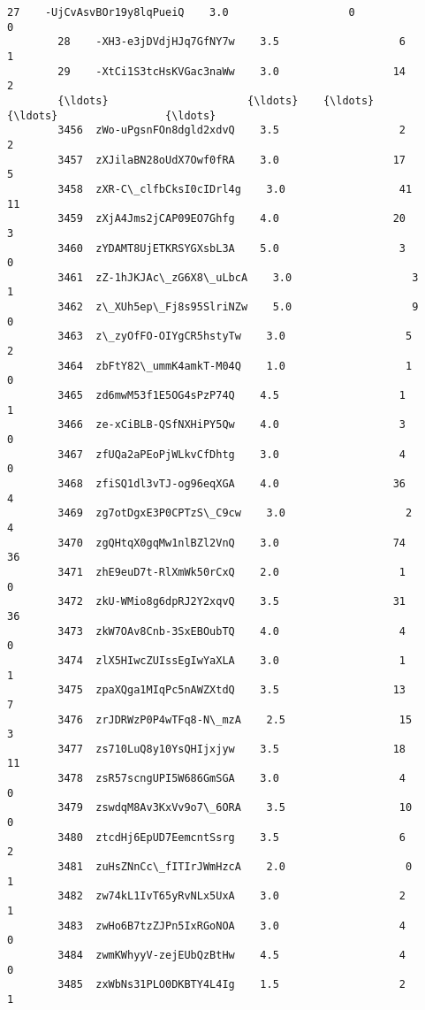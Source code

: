 \documentclass[11pt]{article}
\begin{document}
\begin{Verbatim}[commandchars=\\\{\}]
        27    -UjCvAsvBOr19y8lqPueiQ    3.0                   0                   0   
        28    -XH3-e3jDVdjHJq7GfNY7w    3.5                   6                   1   
        29    -XtCi1S3tcHsKVGac3naWw    3.0                  14                   2   
        {\ldots}                      {\ldots}    {\ldots}                 {\ldots}                 {\ldots}   
        3456  zWo-uPgsnFOn8dgld2xdvQ    3.5                   2                   2   
        3457  zXJilaBN28oUdX7Owf0fRA    3.0                  17                   5   
        3458  zXR-C\_clfbCksI0cIDrl4g    3.0                  41                  11   
        3459  zXjA4Jms2jCAP09EO7Ghfg    4.0                  20                   3   
        3460  zYDAMT8UjETKRSYGXsbL3A    5.0                   3                   0   
        3461  zZ-1hJKJAc\_zG6X8\_uLbcA    3.0                   3                   1   
        3462  z\_XUh5ep\_Fj8s95SlriNZw    5.0                   9                   0   
        3463  z\_zyOfFO-OIYgCR5hstyTw    3.0                   5                   2   
        3464  zbFtY82\_ummK4amkT-M04Q    1.0                   1                   0   
        3465  zd6mwM53f1E5OG4sPzP74Q    4.5                   1                   1   
        3466  ze-xCiBLB-QSfNXHiPY5Qw    4.0                   3                   0   
        3467  zfUQa2aPEoPjWLkvCfDhtg    3.0                   4                   0   
        3468  zfiSQ1dl3vTJ-og96eqXGA    4.0                  36                   4   
        3469  zg7otDgxE3P0CPTzS\_C9cw    3.0                   2                   4   
        3470  zgQHtqX0gqMw1nlBZl2VnQ    3.0                  74                  36   
        3471  zhE9euD7t-RlXmWk50rCxQ    2.0                   1                   0   
        3472  zkU-WMio8g6dpRJ2Y2xqvQ    3.5                  31                  36   
        3473  zkW7OAv8Cnb-3SxEBOubTQ    4.0                   4                   0   
        3474  zlX5HIwcZUIssEgIwYaXLA    3.0                   1                   1   
        3475  zpaXQga1MIqPc5nAWZXtdQ    3.5                  13                   7   
        3476  zrJDRWzP0P4wTFq8-N\_mzA    2.5                  15                   3   
        3477  zs710LuQ8y10YsQHIjxjyw    3.5                  18                  11   
        3478  zsR57scngUPI5W686GmSGA    3.0                   4                   0   
        3479  zswdqM8Av3KxVv9o7\_6ORA    3.5                  10                   0   
        3480  ztcdHj6EpUD7EemcntSsrg    3.5                   6                   2   
        3481  zuHsZNnCc\_fITIrJWmHzcA    2.0                   0                   1   
        3482  zw74kL1IvT65yRvNLx5UxA    3.0                   2                   1   
        3483  zwHo6B7tzZJPn5IxRGoNOA    3.0                   4                   0   
        3484  zwmKWhyyV-zejEUbQzBtHw    4.5                   4                   0   
        3485  zxWbNs31PLO0DKBTY4L4Ig    1.5                   2                   1   
        

\end{Verbatim}
\end{document}
